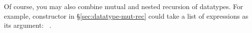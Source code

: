 \begin{isabellebody}
\begin{isamarkuptext}
Of course, you may also combine mutual and nested recursion of datatypes. For example,
constructor  in \S\ref{sec:datatype-mut-rec} could take a list of
expressions as its argument: ~.%
\end{isamarkuptext}%
\isamarkuptrue%
%
\isadelimtheory
%
\endisadelimtheory
%
\isatagtheory
%
\endisatagtheory
{\isafoldtheory}%
%
\isadelimtheory
%
\endisadelimtheory
\end{isabellebody}%

